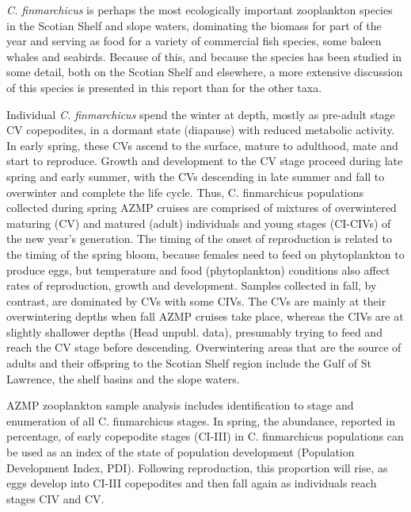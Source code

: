 \documentclass[12pt]{article}\usepackage[]{graphicx}\usepackage[]{color}
\begin{document}
\emph{C. finmarchicus} is perhaps the most ecologically important zooplankton species in the Scotian Shelf and slope waters, dominating the biomass for part of the year and serving as food for a variety of commercial fish species, some baleen whales and seabirds. Because of this, and because the species has been studied in some detail, both on the Scotian Shelf and elsewhere, a more extensive discussion of this species is presented in this report than for the other taxa.

Individual \emph{C. finmarchicus} spend the winter at depth, mostly as pre-adult stage CV copepodites, in a dormant state (diapause) with reduced metabolic activity. In early spring, these CVs ascend to the surface, mature to adulthood, mate and start to reproduce. Growth and development to the CV stage proceed during late spring and early summer, with the CVs descending in late summer and fall to overwinter and complete the life cycle. Thus, C. finmarchicus populations collected during spring AZMP cruises are comprised of mixtures of overwintered maturing (CV) and matured (adult) individuals and young stages (CI-CIVs) of the new year's generation. The timing of the onset of reproduction is related to the timing of the spring bloom, because females need to feed on phytoplankton to produce eggs, but temperature and food (phytoplankton) conditions also affect rates of reproduction, growth and development. Samples collected in fall, by contrast, are dominated by CVs with some CIVs. The CVs are mainly at their overwintering depths when fall AZMP cruises take place, whereas the CIVs are at slightly shallower depths (Head unpubl. data), presumably trying to feed and reach the CV stage before descending. Overwintering areas that are the source of adults and their offspring to the Scotian Shelf region include the Gulf of St Lawrence, the shelf basins and the slope waters.

AZMP zooplankton sample analysis includes identification to stage and enumeration of all C. finmarchicus stages. In spring, the abundance, reported in percentage, of early copepodite stages (CI-III) in C. finmarchicus populations can be used as an index of the state of population development (Population Development Index, PDI). Following reproduction, this proportion will rise, as eggs develop into CI-III copepodites and then fall again as individuals reach stages CIV and CV.
\end{document}
